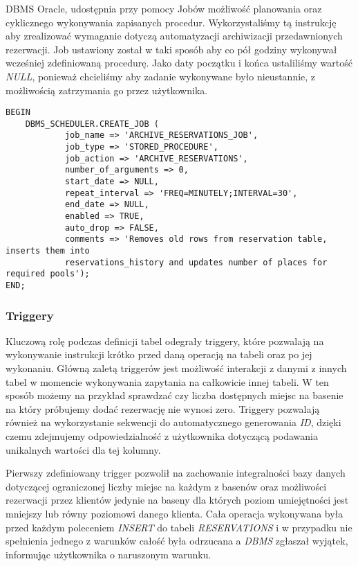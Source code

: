 \documentclass[a4paper]{article}
\begin{document}
DBMS Oracle, udostępnia przy pomocy Jobów możliwość planowania oraz cyklicznego wykonywania zapisanych procedur. Wykorzystaliśmy tą instrukcję aby zrealizować wymaganie dotyczą automatyzacji archiwizacji przedawnionych rezerwacji. Job ustawiony został w taki sposób aby co pół godziny wykonywał wcześniej zdefiniowaną procedurę. Jako daty początku i końca ustaliliśmy wartość \textit{NULL}, ponieważ chcieliśmy aby zadanie wykonywane było nieustannie, z możliwością zatrzymania go przez użytkownika.

\begin{verbatim}
BEGIN
    DBMS_SCHEDULER.CREATE_JOB (
            job_name => 'ARCHIVE_RESERVATIONS_JOB',
            job_type => 'STORED_PROCEDURE',
            job_action => 'ARCHIVE_RESERVATIONS',
            number_of_arguments => 0,
            start_date => NULL,
            repeat_interval => 'FREQ=MINUTELY;INTERVAL=30',
            end_date => NULL,
            enabled => TRUE,
            auto_drop => FALSE,
            comments => 'Removes old rows from reservation table, inserts them into
            reservations_history and updates number of places for required pools');
END;
\end{verbatim}

\subsubsection{Triggery}

Kluczową rolę podczas definicji tabel odegrały triggery, które pozwalają na wykonywanie instrukcji krótko przed daną operacją na tabeli oraz po jej wykonaniu. Główną zaletą triggerów jest możliwość interakcji z danymi z innych tabel w momencie wykonywania zapytania na całkowicie innej tabeli. W ten sposób możemy na przykład sprawdzać czy liczba dostępnych miejsc na basenie na który próbujemy dodać rezerwację nie wynosi zero. Triggery pozwalają również na wykorzystanie sekwencji do automatycznego generowania \textit{ID}, dzięki czemu zdejmujemy odpowiedzialność z użytkownika dotyczącą podawania unikalnych wartości dla tej kolumny.

Pierwszy zdefiniowany trigger pozwolił na zachowanie integralności bazy danych dotyczącej ograniczonej liczby miejsc na każdym z basenów oraz możliwości rezerwacji przez klientów jedynie na baseny dla których poziom umiejętności jest mniejszy lub równy poziomowi danego klienta. Cała operacja wykonywana była przed każdym poleceniem \textit{INSERT} do tabeli \textit{RESERVATIONS} i w przypadku nie spełnienia jednego z warunków całość była odrzucana a \textit{DBMS} zgłaszał wyjątek, informując użytkownika o naruszonym warunku.
\end{document}
